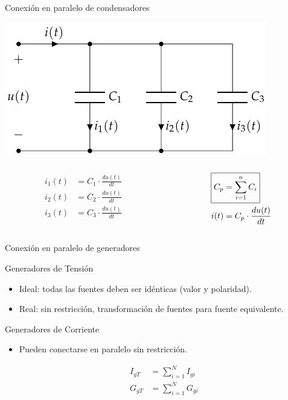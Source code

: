 \documentclass[aspectratio=169, usenames,svgnames,dvipsnames]{beamer}
\begin{document}
\begin{frame}[label={sec:orgbc9740d}]{Conexión en paralelo de condensadores}
\begin{center}
\includegraphics[height=0.45\textheight]{../figs/CondensadoresParalelo.pdf}
\end{center}
\begin{columns}
\begin{column}{0.5\columnwidth}
\begin{align*}
  i_1(t) &= C_1 \cdot \frac{du(t)}{dt}\\
  i_2(t) &= C_2 \cdot \frac{du(t)}{dt}\\
  i_3(t) &= C_3 \cdot \frac{du(t)}{dt}\\
\end{align*}
\end{column}
\begin{column}{0.5\columnwidth}
\begin{align*}
  \Aboxed{C_p &= \sum_{i = 1}^n C_i}\\
  i(t) &= C_p \cdot \frac{du(t)}{dt}
\end{align*}
\end{column}
\end{columns}
\end{frame}

\begin{frame}[label={sec:org0db4317}]{Conexión en paralelo de generadores}
\begin{block}{Generadores de Tensión}
\begin{itemize}
\item Ideal: todas las fuentes deben ser idénticas (valor y polaridad).
\item Real:  sin restricción, transformación de fuentes para fuente equivalente.
\end{itemize}
\end{block}


\begin{block}{Generadores de Corriente}
\begin{itemize}
\item Pueden conectarse en paralelo sin restricción.

\begin{align*}
  I_{gT} &= \sum_{i = 1}^N I_{gi}\\
  G_{gT} &= \sum_{i = 1}^N G_{gi}\\ 
\end{align*}
\end{itemize}
\end{block}
\end{frame}
\end{document}
